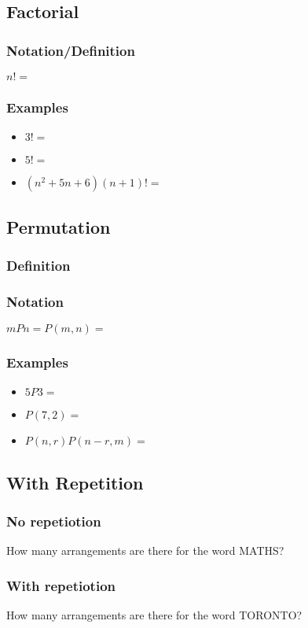 \documentclass{article}
\begin{document}
\subsection{Factorial}
\subsubsection{Notation/Definition}
$n!=$
\subsubsection{Examples}
\begin{itemize}
    \item $3!=$
    \item $5!=$
    \item $(n^2+5n+6)(n+1)!=$ 
\end{itemize}

\subsection{Permutation}
\subsubsection{Definition}
\vspace{20px}
\subsubsection{Notation}
$mPn=P(m,n)=$
\subsubsection{Examples}
\begin{itemize}
    \item $5P3=$
    \item $P(7,2)=$
    \item $P(n,r)P(n-r,m)=$ 
\end{itemize}
\subsection{With Repetition}
\subsubsection{No repetiotion}
How many arrangements are there for the word MATHS?
\vspace{20px}
\subsubsection{With repetiotion}
How many arrangements are there for the word TORONTO?
\vspace{20px}
\end{document}
